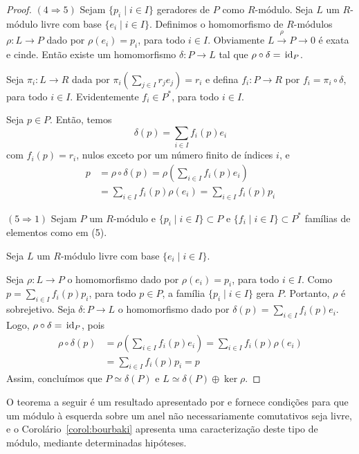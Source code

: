 \begin{teo}
\begin{proof}
$(4 \Rightarrow 5)$ Sejam $\{p_i \mid i \in I\}$ geradores de $P$ como $R$-módulo. Seja $L$ um $R$-módulo livre com base $\{e_i \mid i \in I\}$. Definimos o homomorfismo de $R$-módulos $\rho: L \rightarrow P$ dado por $\rho(e_i)=p_i$, para todo $i \in I$. Obviamente $L\xrightarrow{\rho} P \rightarrow 0$ é exata e cinde. Então existe um homomorfismo $\delta: P \rightarrow L$ tal que $\rho \circ \delta = \, \textrm{id}_{P}$. \par
Seja $\pi_i:L \rightarrow R$ dada por $\pi_i(\sum_{j \in I}r_j e_j)=r_i$ e defina $f_i: P \rightarrow R$ por $f_i = \pi_i \circ \delta$, para todo $i \in I$. Evidentemente $f_i \in P^*$, para todo $i\in I$. \par 
Seja $p \in P$. Então, temos \[\delta(p)=\sum_{i\in I}f_i(p)e_i\] com $f_i(p)=r_i$, nulos exceto por um número finito de índices $i$, e
\begin{align*}
p &= \rho \circ \delta (p) = \rho \left(\sum_{i\in I}f_i(p)e_i \right) \\
&= \sum_{i \in I} f_i(p)\rho(e_i) = \sum_{i \in I} f_i(p)p_i
\end{align*}

$(5 \Rightarrow 1)$ Sejam $P$ um $R$-módulo e $\{p_i \mid i \in I\} \subset P$ e $\{f_i \mid i \in I\}\subset P^*$ famílias de elementos como em (5). \par
Seja $L$ um $R$-módulo livre com base $\{e_i\mid i \in I\}$. \par
Seja $\rho: L \rightarrow P$ o homomorfismo dado por $\rho(e_i)=p_i$, para todo $i \in I$. Como $p= \sum_{i \in I}f_i(p)p_i$, para todo $p \in P$, a família $\{p_i \mid i \in I\}$ gera $P$. Portanto, $\rho$ é sobrejetivo. Seja $\delta: P\rightarrow L$ o homomorfismo dado por $\delta(p)=\sum_{i\in I}f_i(p) e_i$. Logo, $\rho \circ \delta = \, \textrm{id}_{P}$, pois
\begin{align*}
    \rho \circ \delta (p) &= \rho \left( \sum_{i \in I} f_i(p)e_i \right) = \sum_{i \in I} f_i(p) \rho(e_i) \\
    &= \sum_{i \in I} f_i(p) p_i = p
\end{align*}
Assim, concluímos que $P \simeq \delta(P)$ e $L \simeq \delta(P) \oplus \ker\rho$.
\end{proof}
\end{teo}
O teorema a seguir é um resultado apresentado por \citeauthor{bourbaki} e fornece condições para que um módulo à esquerda sobre um anel não necessariamente comutativos seja livre, e o Corolário~\ref{corol:bourbaki} apresenta uma caracterização deste tipo de módulo, mediante determinadas hipóteses.

